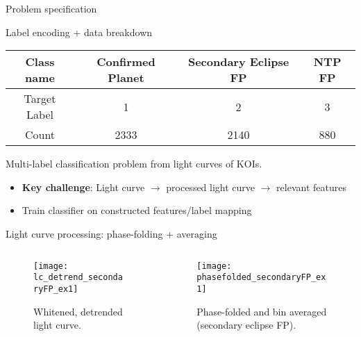 \documentclass{beamer}
\begin{document}
\begin{frame}{Problem specification}
	\begin{block}{Label encoding + data breakdown}
		\begin{adjustbox}{max totalsize={.9\textwidth}{.7\textheight},center}
			
			\begin{tabular}{|c|c|c|c|}
			\hline
			Class name & Confirmed Planet  & Secondary Eclipse FP   &  NTP FP  \\
			\hline
			Target Label & 1  & 2 & 3    \\
			\hline
			Count & 2333 & 2140 & 880 \\
			\hline
			
		\end{tabular}
	
	\end{adjustbox}
	\end{block}
	Multi-label classification problem from light curves of KOIs.

\begin{itemize}
\item \textbf{Key challenge}: Light curve $\rightarrow$ processed light curve $\rightarrow$ relevant features
\item Train classifier on constructed features/label mapping
\end{itemize}

	
\end{frame}

\begin{frame}{Light curve processing: phase-folding + averaging}
\begin{columns}
	\begin{column}{0.5\textwidth}
	\begin{figure}
		\texttt{[image: lc\_detrend\_secondaryFP\_ex1]}
		\caption{Whitened, detrended light curve.}
	\end{figure}
	\end{column}
	\begin{column}{0.5\textwidth}
	\begin{figure}
	\texttt{[image: phasefolded\_secondaryFP\_ex1]}
	\caption{Phase-folded and bin averaged (secondary eclipse FP).}
	\end{figure}
	\end{column}

\end{columns}	
\end{frame}
\end{document}
